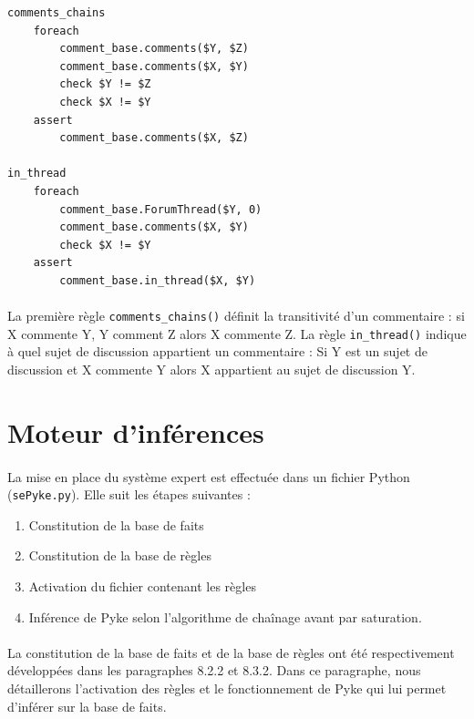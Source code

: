 \documentclass {report}
\begin{document}
\begin{lstlisting}[caption= Base de règle du cube Forum]
comments_chains
	foreach
		comment_base.comments($Y, $Z)
		comment_base.comments($X, $Y)
		check $Y != $Z
		check $X != $Y
	assert
		comment_base.comments($X, $Z)

in_thread
	foreach
		comment_base.ForumThread($Y, 0)
		comment_base.comments($X, $Y)
		check $X != $Y
	assert
		comment_base.in_thread($X, $Y)
\end{lstlisting}

\paragraph{}
La première règle \verb+comments_chains()+ définit la transitivité d'un commentaire : si X commente Y, Y comment Z alors X commente Z. La règle \verb+in_thread()+ indique à quel sujet de discussion appartient un commentaire : Si Y est un sujet de discussion et X commente Y alors X appartient au sujet de discussion Y.




\section{Moteur d'inférences}

\paragraph{}
La mise en place du système expert est effectuée dans un fichier Python (\verb+sePyke.py+). Elle suit les étapes suivantes : 
\begin{enumerate}
    \item Constitution de la base de faits
    \item Constitution de la base de règles
    \item Activation du fichier contenant les règles
    \item Inférence de Pyke selon l'algorithme de chaînage avant par saturation.
\end{enumerate}
\paragraph{}
La constitution de la base de faits et de la base de règles ont été respectivement développées dans les paragraphes 8.2.2 et 8.3.2. Dans ce paragraphe, nous détaillerons l'activation des règles et le fonctionnement de Pyke qui lui permet d'inférer sur la base de faits.
\end{document}
